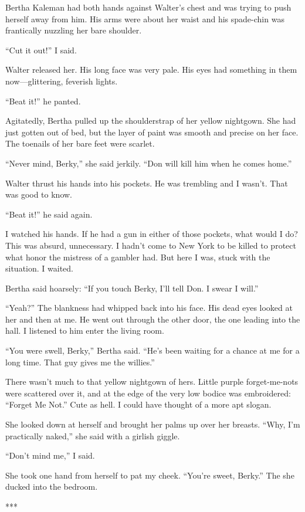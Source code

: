 \documentclass{novel}
\begin{document}
Bertha Kaleman had both hands against Walter’s chest and was trying to push herself away from him. His arms were about her waist and his spade-chin was frantically nuzzling her bare shoulder.

“Cut it out!” I said.

Walter released her. His long face was very pale. His eyes had something in them now—glittering, feverish lights.

“Beat it!” he panted.

Agitatedly, Bertha pulled up the shoulderstrap of her yellow nightgown. She had just gotten out of bed, but the layer of paint was smooth and precise on her face. The toenails of her bare feet were scarlet.

“Never mind, Berky,” she said jerkily. “Don will kill him when he comes home.”

Walter thrust his hands into his pockets. He was trembling and I wasn’t. That was good to know.

“Beat it!” he said again.

I watched his hands. If he had a gun in either of those pockets, what would I do? This was absurd, unnecessary. I hadn’t come to New York to be killed to protect what honor the mistress of a gambler had. But here I was, stuck with the situation. I waited.

Bertha said hoarsely: “If you touch Berky, I’ll tell Don. I swear I will.”

“Yeah?” The blankness had whipped back into his face. His dead eyes looked at her and then at me. He went out through the other door, the one leading into the hall. I listened to him enter the living room.

“You were swell, Berky,” Bertha said. “He’s been waiting for a chance at me for a long time. That guy gives me the willies.”

There wasn’t much to that yellow nightgown of hers. Little purple forget-me-nots were scattered over it, and at the edge of the very low bodice was embroidered: “Forget Me Not.” Cute as hell. I could have thought of a more apt slogan.

She looked down at herself and brought her palms up over her breasts. “Why, I’m practically naked,” she said with a girlish giggle.

“Don’t mind me,” I said.

She took one hand from herself to pat my cheek. “You’re sweet, Berky.” The she ducked into the bedroom.

***
\end{document}
